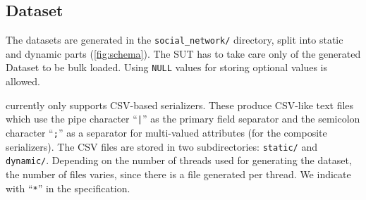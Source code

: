








\subsection{Dataset}

The datasets are generated in the \texttt{social\_network/} directory, split into static and dynamic parts (\autoref{fig:schema}).
The SUT has to take care only of the generated Dataset to be bulk loaded. Using \texttt{NULL} values for storing optional values is allowed.

\datagen currently only supports CSV-based serializers.
These produce CSV-like text files which use the pipe character ``\texttt{|}'' as the primary field separator and the semicolon character ``\texttt{;}'' as a separator for multi-valued attributes (for the composite serializers).
The CSV files are stored in two subdirectories: \texttt{static/} and \texttt{dynamic/}.
Depending on the number of threads used for generating the dataset, the number of files varies, since there is a file generated per thread. We indicate with ``\texttt{*}'' in the specification.

